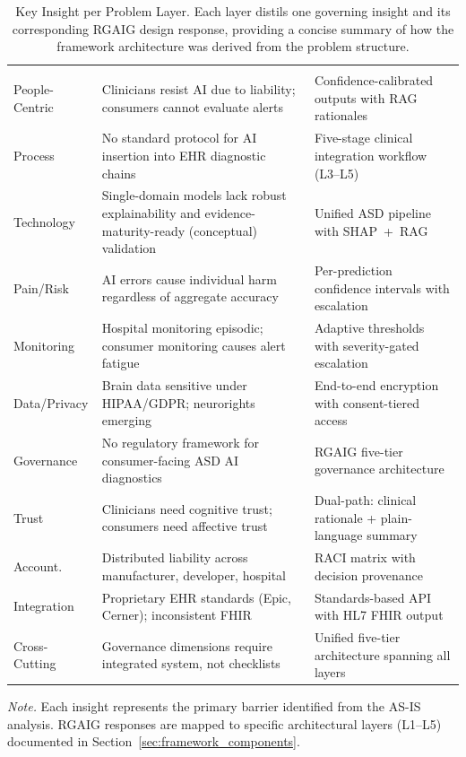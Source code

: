 {\tablestripes\tablefontsize
\begin{xltabular}{\textwidth}{@{} >{\raggedright\arraybackslash}p{2.2cm} L L @{}}
\caption[Key Insight per Problem Layer]{Key Insight per Problem Layer. Each layer distils one governing insight and its corresponding RGAIG design response, providing a concise summary of how the framework architecture was derived from the problem structure.}\label{tab:layer_key_insights} \\
\toprule
{} &  &  \\
\midrule
\endfirsthead
\toprule
{} &  &  \\
\midrule
\endhead
\bottomrule
\endlastfoot
People-Centric & Clinicians resist AI due to liability; consumers cannot evaluate alerts & Confidence-calibrated outputs with RAG rationales \\
\addlinespace
Process & No standard protocol for AI insertion into EHR diagnostic chains & Five-stage clinical integration workflow (L3--L5) \\
\addlinespace
Technology & Single-domain models lack robust explainability and evidence-maturity-ready (conceptual) validation & Unified ASD pipeline with SHAP~+~RAG \\
\addlinespace
Pain/Risk & AI errors cause individual harm regardless of aggregate accuracy & Per-prediction confidence intervals with escalation \\
\addlinespace
Monitoring & Hospital monitoring episodic; consumer monitoring causes alert fatigue & Adaptive thresholds with severity-gated escalation \\
\addlinespace
Data/Privacy & Brain data sensitive under HIPAA/GDPR; neurorights emerging & End-to-end encryption with consent-tiered access \\
\addlinespace
Governance & No regulatory framework for consumer-facing ASD AI diagnostics & RGAIG five-tier governance architecture \\
\addlinespace
Trust & Clinicians need cognitive trust; consumers need affective trust & Dual-path: clinical rationale + plain-language summary \\
\addlinespace
Account. & Distributed liability across manufacturer, developer, hospital & RACI matrix with decision provenance \\
\addlinespace
Integration & Proprietary EHR standards (Epic, Cerner); inconsistent FHIR & Standards-based API with HL7 FHIR output \\
\addlinespace
Cross-Cutting & Governance dimensions require integrated system, not checklists & Unified five-tier architecture spanning all layers \\
\end{xltabular}}
\vspace{0.5em}
\noindent\textit{Note.} Each insight represents the primary barrier identified from the AS-IS analysis. RGAIG responses are mapped to specific architectural layers (L1--L5) documented in Section~\ref{sec:framework_components}.


